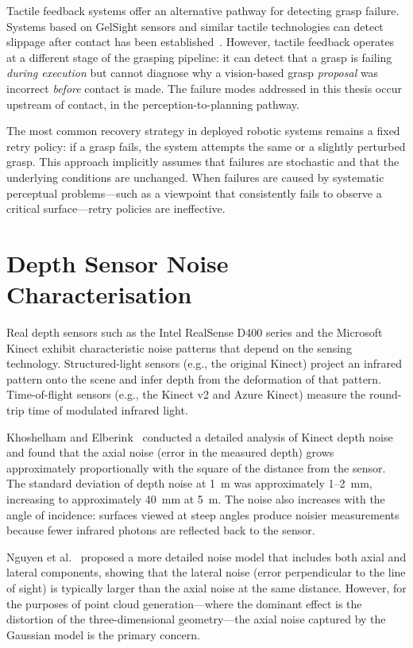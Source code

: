 \documentclass[11pt,a4paper]{report}
\begin{document}
Tactile feedback systems offer an alternative pathway for detecting grasp failure. Systems based on GelSight sensors and similar tactile technologies can detect slippage after contact has been established~\cite{calandra2018more}. However, tactile feedback operates at a different stage of the grasping pipeline: it can detect that a grasp is failing \emph{during execution} but cannot diagnose why a vision-based grasp \emph{proposal} was incorrect \emph{before} contact is made. The failure modes addressed in this thesis occur upstream of contact, in the perception-to-planning pathway.

The most common recovery strategy in deployed robotic systems remains a fixed retry policy: if a grasp fails, the system attempts the same or a slightly perturbed grasp. This approach implicitly assumes that failures are stochastic and that the underlying conditions are unchanged. When failures are caused by systematic perceptual problems---such as a viewpoint that consistently fails to observe a critical surface---retry policies are ineffective.

\section{Depth Sensor Noise Characterisation}
\label{sec:bg_depth}

Real depth sensors such as the Intel RealSense D400 series and the Microsoft Kinect exhibit characteristic noise patterns that depend on the sensing technology. Structured-light sensors (e.g., the original Kinect) project an infrared pattern onto the scene and infer depth from the deformation of that pattern. Time-of-flight sensors (e.g., the Kinect v2 and Azure Kinect) measure the round-trip time of modulated infrared light.

Khoshelham and Elberink~\cite{khoshelham2011accuracy} conducted a detailed analysis of Kinect depth noise and found that the axial noise (error in the measured depth) grows approximately proportionally with the square of the distance from the sensor. The standard deviation of depth noise at 1~m was approximately 1--2~mm, increasing to approximately 40~mm at 5~m. The noise also increases with the angle of incidence: surfaces viewed at steep angles produce noisier measurements because fewer infrared photons are reflected back to the sensor.

Nguyen et al.~\cite{nguyen2012modeling} proposed a more detailed noise model that includes both axial and lateral components, showing that the lateral noise (error perpendicular to the line of sight) is typically larger than the axial noise at the same distance. However, for the purposes of point cloud generation---where the dominant effect is the distortion of the three-dimensional geometry---the axial noise captured by the Gaussian model is the primary concern.
\end{document}
